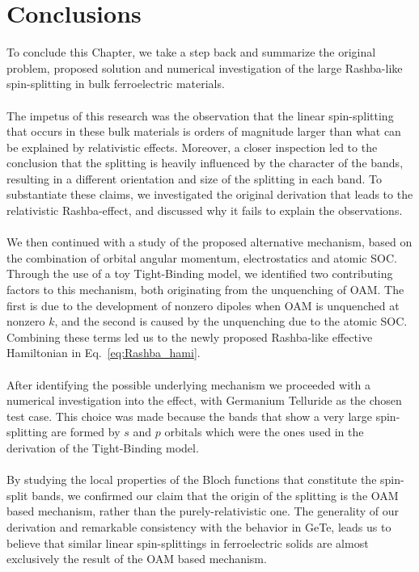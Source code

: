 \section{Conclusions}
To conclude this Chapter, we take a step back and summarize the original problem, proposed solution and numerical investigation of the large Rashba-like spin-splitting in bulk ferroelectric materials.
\\\\
The impetus of this research was the observation that the linear spin-splitting that occurs in these bulk materials is orders of magnitude larger than what can be explained by relativistic effects.
Moreover, a closer inspection led to the conclusion that the splitting is heavily influenced by the character of the bands, resulting in a different orientation and size of the splitting in each band.
To substantiate these claims, we investigated the original derivation that leads to the relativistic Rashba-effect, and discussed why it fails to explain the observations.
\\\\
We then continued with a study of the proposed alternative mechanism, based on the combination of orbital angular momentum, electrostatics and atomic SOC.
Through the use of a toy Tight-Binding model, we identified two contributing factors to this mechanism, both originating from the unquenching of OAM. The first is due to the development of nonzero dipoles when OAM is unquenched at nonzero $k$, and the second is caused by the unquenching due to the atomic SOC.
Combining these terms led us to the newly proposed Rashba-like effective Hamiltonian in Eq.~\eqref{eq:Rashba_hami}.
\\\\
After identifying the possible underlying mechanism we proceeded with a numerical investigation into the effect, with Germanium Telluride as the chosen test case.
This choice was made because the bands that show a very large spin-splitting are formed by $s$ and $p$ orbitals which were the ones used in the derivation of the Tight-Binding model.
\\\\
By studying the local properties of the Bloch functions that constitute the spin-split bands, we confirmed our claim that the origin of the splitting is the OAM based mechanism, rather than the purely-relativistic one.
The generality of our derivation and remarkable consistency with the behavior in GeTe, leads us to believe that similar linear spin-splittings in ferroelectric solids are almost exclusively the result of the OAM based mechanism.
